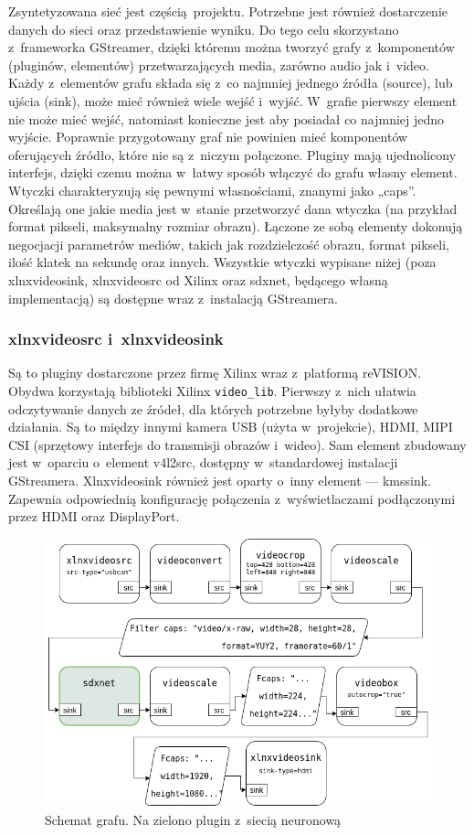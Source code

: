 \documentclass[12pt, oneside, a4paper]{article}
\begin{document}
Zsyntetyzowana sieć jest częścią projektu. Potrzebne jest również dostarczenie
danych do sieci oraz przedstawienie wyniku.
Do tego celu skorzystano z~frameworka GStreamer, dzięki któremu można
tworzyć grafy z~komponentów (pluginów, elementów)
przetwarzających media, zarówno audio jak i~video.
Każdy z~elementów grafu składa się z~co najmniej jednego źródła (source),
lub ujścia (sink), może mieć również wiele wejść i~wyjść. W~grafie pierwszy
element nie może mieć wejść, natomiast konieczne jest aby posiadał co najmniej
jedno wyjście. Poprawnie przygotowany graf nie powinien mieć komponentów
oferujących źródło, które nie są z~niczym połączone.
Pluginy mają ujednolicony interfejs, dzięki czemu można w~łatwy sposób
włączyć do grafu własny element. Wtyczki charakteryzują się
pewnymi własnościami, znanymi jako „caps”. Określają one jakie 
media jest w~stanie przetworzyć dana wtyczka (na przykład format pikseli,
maksymalny rozmiar obrazu). 
Łączone ze sobą elementy dokonują negocjacji
parametrów mediów, takich jak rozdzielczość obrazu, format pikseli,
ilość klatek na sekundę oraz innych. Wszystkie wtyczki wypisane niżej
(poza xlnxvideosink, xlnxvideosrc od Xilinx oraz sdxnet, będącego
własną implementacją) są dostępne wraz z~instalacją GStreamera.

\subsubsection{xlnxvideosrc i~xlnxvideosink}\label{sec:xlnxvideosrc i~xlnxvideosink}
Są to pluginy dostarczone przez firmę Xilinx wraz z~platformą reVISION.
Obydwa korzystają biblioteki Xilinx \lstinline{video_lib}.
Pierwszy z~nich ułatwia odczytywanie danych ze źródeł, dla których potrzebne
byłyby dodatkowe działania. Są to między innymi kamera USB (użyta w~projekcie),
HDMI, MIPI CSI (sprzętowy interfejs do transmisji obrazów i~wideo).
Sam element zbudowany jest w~oparciu o~element v4l2src\cite[s.33]{ug1221}, dostępny
w~standardowej instalacji GStreamera.
Xlnxvideosink również jest oparty o~inny element --- kmssink\cite[s.33]{ug1221}.
Zapewnia odpowiednią konfigurację połączenia z~wyświetlaczami
podłączonymi przez HDMI oraz DisplayPort.

\begin{figure}[h]
  \centering
  \includegraphics[width=0.9\linewidth]{figures/pipeline.png}
  \caption{Schemat grafu. Na zielono plugin z~siecią neuronową}\label{fig:pipeline}
\end{figure}
\end{document}
